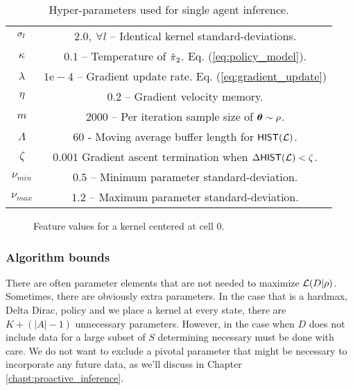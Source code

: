     \begin{table}[H]
    \centering
        \begin{tabular}{c|c}
            $\sigma_{l}$ & $2.0,\ \forall l$ -- Identical kernel standard-deviations.\\
            $\kappa$ & $0.1$ -- Temperature of $\hat{\pi_{}}_2$. Eq. (\ref{eq:policy_model}). \\
            $\lambda$ & $1\mathrm{e}\!-\!4$ -- Gradient update rate. Eq. (\ref{eq:gradient_update}) \\
            $\eta$ & $0.2$ -- Gradient velocity memory.\\
            $m$ & 2000 -- Per iteration sample size of $\boldsymbol{\mathbb{\theta}}\sim \rho$.\\
            $\Lambda$ & $60$ - Moving average buffer length for $\mathsf{HIST}(\mathcal{L})$. \\
            $\zeta$ & $0.001$ Gradient ascent termination when $\Delta\mathsf{HIST}(\mathcal{L}) < \zeta$.\\
            $\nu_{min}$ & $0.5$ -- Minimum parameter standard-deviation.\\
            $\nu_{max}$ & $1.2$ -- Maximum parameter standard-deviation.\\
        \end{tabular}
    \caption{Hyper-parameters used for single agent inference.}
    \label{table:single_agent_hyper_params}
    \end{table}

    \begin{figure}[h]
        \missingfigure{\Huge}
        \caption{Feature values for a kernel centered at cell $0$.}
        \label{fig:kernel_visualization}
    \end{figure}

\subsubsection{Algorithm bounds}

    There are often parameter elements that are not needed to maximize $\mathcal{L}(D|\rho)$. Sometimes, there are
    obviously extra parameters. In the case that  is a hardmax, Delta Dirac, policy and we place a kernel at
    every state, there are $K+(|A|-1)$ unnecessary parameters. However, in the case when $D$ does not include data for a
    large subset of $S$ determining necessary must be done with care. We do not want to exclude a pivotal parameter that
    might be necessary to incorporate any future data, as we'll discuss in Chapter \ref{chapt:proactive_inference}.

